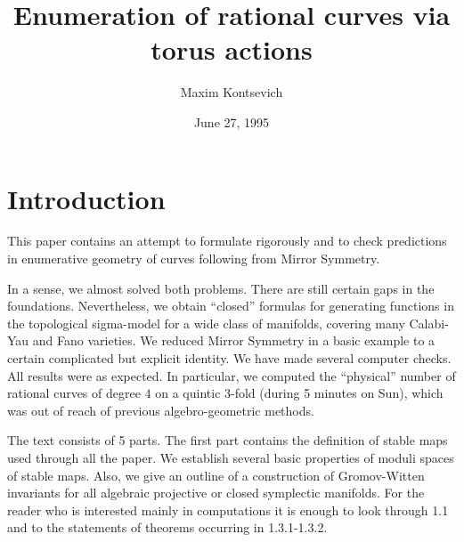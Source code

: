\documentclass{amsart}
\title{Enumeration of rational curves via torus actions}
\author{Maxim Kontsevich}
\begin{document}
\date{June 27, 1995}
\maketitle
\tableofcontents

\newcommand{\Cal}{\mathcal}

\newcommand{\Q}{\mathbf Q}
\newcommand{\C}{\mathbf C}
\renewcommand{\P}{\mathbf P}
\renewcommand{\O}{\mathcal O}
\newcommand{\E}{\mathcal Q}
\newcommand{\F}{\mathcal F}
\newcommand{\T}{\mathbf T}
\newcommand{\M}{\overline{\mathcal{M}}}
\newcommand{\eps}{\epsilon}
\renewcommand{\l}{\lambda}
\newcommand{\Z}{\mathbf Z}

\newcommand{\dsize}{\displaystyle}




\section*{Introduction}

This paper contains an attempt to formulate rigorously and to check
predictions in enumerative geometry of curves following from Mirror Symmetry.

In a sense, we almost solved both problems.
There are still certain gaps in the foundations. Nevertheless, we obtain
``closed'' formulas for generating functions in the topological sigma-model for
a wide class of manifolds, covering many Calabi-Yau and Fano varieties. We
reduced Mirror Symmetry in a basic example  to a certain complicated but
explicit identity.
 We have made several computer checks. All results were as expected.  In
particular, we computed the ``physical'' number of rational curves of degree
$4$ on a quintic $3$-fold (during 5 minutes on Sun), which was out of reach of
previous algebro-geometric methods.

The text consists of 5 parts.
 The first part contains the definition of stable maps used through all the
paper. We establish several basic properties of  moduli spaces of stable maps.
 Also, we give an outline of a  construction of Gromov-Witten invariants
 for all algebraic projective or closed symplectic manifolds.
 For the reader who is interested mainly in computations it is enough to look
through 1.1 and to the statements of theorems occurring in 1.3.1-1.3.2.
\end{document}
